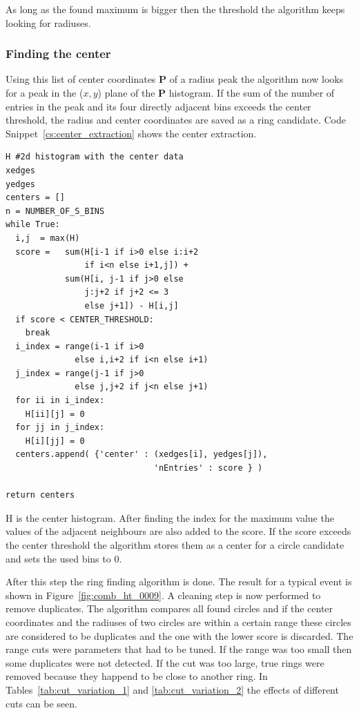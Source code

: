 \documentclass[11pt]{scrreprt}
\begin{document}
As long as the found maximum is bigger then the threshold the algorithm keeps looking for radiuses.

\subsubsection{Finding the center} %
\label{ssub:finding_the_center}
Using this list of center coordinates $\mathbf{P}$ of a radius peak the algorithm now looks for a peak in the ($x,y$) plane of the $\mathbf{P}$ histogram. If the sum of the number of entries in the peak and its four directly adjacent bins exceeds the center threshold, the radius and center coordinates are saved as a ring candidate. Code Snippet~\ref{cs:center_extraction} shows the center extraction.

\begin{codesnippet}
  \begin{lstlisting}
H #2d histogram with the center data
xedges 
yedges 
centers = []
n = NUMBER_OF_S_BINS
while True:
  i,j  = max(H)
  score =   sum(H[i-1 if i>0 else i:i+2 
                if i<n else i+1,j]) + 
            sum(H[i, j-1 if j>0 else
                j:j+2 if j+2 <= 3 
                else j+1]) - H[i,j]
  if score < CENTER_THRESHOLD:
    break
  i_index = range(i-1 if i>0 
              else i,i+2 if i<n else i+1)
  j_index = range(j-1 if j>0 
              else j,j+2 if j<n else j+1)
  for ii in i_index:
    H[ii][j] = 0  
  for jj in j_index:
    H[i][jj] = 0
  centers.append( {'center' : (xedges[i], yedges[j]), 
                              'nEntries' : score } )

return centers
\end{lstlisting}
\caption[Center coordinate extraction]{H is the center histogram. After finding the index for the maximum value the values of the 
adjacent neighbours are also added to the score. If the score exceeds the center threshold the algorithm stores them as a center for
a circle candidate and sets the used bins to 0.}\label{cs:center_extraction}
\end{codesnippet}


After this step the ring finding algorithm is done. The result for a typical event is shown in Figure~\ref{fig:comb_ht_0009}. A cleaning step is now performed to remove duplicates. The algorithm compares all found circles and if the center coordinates and the radiuses of two circles are within a certain range these circles are considered to be duplicates and the one with the lower score is discarded. The range cuts were parameters that had to be tuned. If the range was too small then some duplicates were not detected. If the cut was too large, true rings were removed because they
happend to be close to another ring. In Tables~\ref{tab:cut_variation_1} and \ref{tab:cut_variation_2} the effects of different
cuts can be seen.
\end{document}
